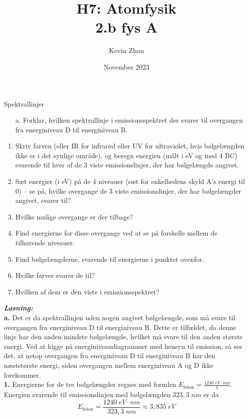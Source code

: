 \documentclass{report}
\title{H7: Atomfysik\\
{\Large \textbf{2.b fys A}}}
\author{Kevin Zhou}
\date{November 2023}
\newcommand{\sol}{\setlength{\parindent}{0cm}\textbf{\textit{Løsning:}}\setlength{\parindent}{1cm}}
\begin{document}
\maketitle
\begin{question}{Spektrallinjer}{}
\begin{itemize}
  \item[a.] Forklar, hvilken spektrallinje i emissionsspektret der svarer til overgangen fra energiniveau D til energiniveau B.
\end{itemize}
\begin{enumerate}
  \item Skriv farven (eller IR for infrarød eller UV for ultraviolet, hvis bølgelængden ikke er i det synlige område), og beregn  energien (målt i eV og med 4 BC) svarende til hver af de 3 viste emissionslinjer, der har bølgelængde angivet.
\item Sæt energier (i eV) på de 4 niveauer (sæt for enkelhedens skyld A’s energi til 0) – se på, hvilke overgange de 3 viste emissionslinjer, der har bølgelængder angivet, svarer til?
\item Hvilke mulige overgange er der tilbage?
\item Find energierne for disse overgange ved at se på forskelle mellem de tilhørende niveauer.
\item Find bølgelængderne, svarende til energierne i punktet ovenfor.
\item Hvilke farver svarer de til?
\item Hvilken af dem er den viste i emissionsspektret?
\end{enumerate}
\end{question}
\sol \\ 
\textbf{a.} Det er da spektrallinjen uden nogen angivet bølgelængde, som må svare til overgangen fra energiniveau D til energiniveau B.
Dette er tilfældet, da denne linje har den anden mindste bølgelængde, hvilket må svare til den anden største energi.
Ved at kigge på energiniveaudiagrammet med hensyn til emission, så ses det, at netop overgangen fra energiniveau D til energiniveau B har den næststørste energi, siden overgangen mellem energiniveau A og D ikke forekommer. \\[1ex]
\textbf{1.} Energierne for de tre bølgelængder regnes med formlen $E_{\text{foton}}=\frac{1240 \;\unit{eV}\cdot \unit{nm}}{\lambda}$. 
Energien svarende til emissionslinjen med bølgelængden $323,3 \;\unit{nm} $ er da
\[
E_{\text{foton}}=\frac{1240 \;\unit{eV}\cdot \unit{nm}}{323,3 \;\unit{nm} }
\approx 3,835 \;\unit{eV} 
\] 
\end{document}
